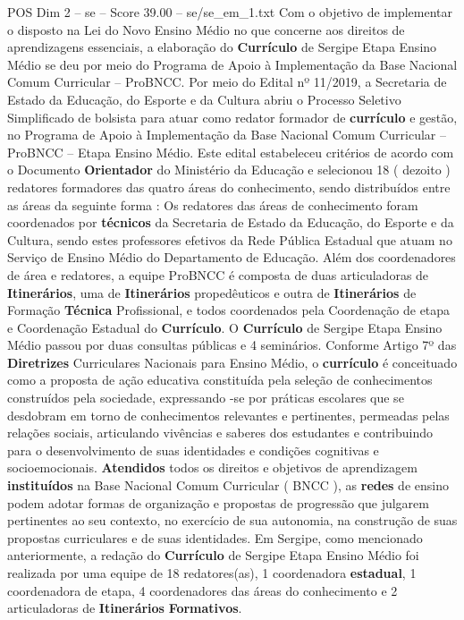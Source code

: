 \begin{textsample}{POS Dim 2 – se – Score 39.00 – se/se\_em\_1.txt}
Com o objetivo de implementar o disposto na Lei do Novo Ensino Médio no que concerne aos direitos de aprendizagens essenciais, a elaboração do \textbf{Currículo} de Sergipe Etapa Ensino Médio se deu por meio do Programa de Apoio à Implementação da Base Nacional Comum Curricular – ProBNCC.
Por meio do Edital nº 11/2019, a Secretaria de Estado da Educação, do Esporte e da Cultura abriu o Processo Seletivo Simplificado de bolsista para atuar como redator formador de \textbf{currículo} e gestão, no Programa de Apoio à Implementação da Base Nacional Comum Curricular – ProBNCC – Etapa Ensino Médio.
Este edital estabeleceu critérios de acordo com o Documento \textbf{Orientador} do Ministério da Educação e selecionou 18 ( dezoito ) redatores formadores das quatro áreas do conhecimento, sendo distribuídos entre as áreas da seguinte forma : Os redatores das áreas de conhecimento foram coordenados por \textbf{técnicos} da Secretaria de Estado da Educação, do Esporte e da Cultura, sendo estes professores efetivos da Rede Pública Estadual que atuam no Serviço de Ensino Médio do Departamento de Educação.
Além dos coordenadores de área e redatores, a equipe ProBNCC é composta de duas articuladoras de \textbf{Itinerários}, uma de \textbf{Itinerários} propedêuticos e outra de \textbf{Itinerários} de Formação \textbf{Técnica} Profissional, e todos coordenados pela Coordenação de etapa e Coordenação Estadual do \textbf{Currículo}.
O \textbf{Currículo} de Sergipe Etapa Ensino Médio passou por duas consultas públicas e 4 seminários.
Conforme Artigo 7º das \textbf{Diretrizes} Curriculares Nacionais para Ensino Médio, o \textbf{currículo} é conceituado como a proposta de ação educativa constituída pela seleção de conhecimentos construídos pela sociedade, expressando -se por práticas escolares que se desdobram em torno de conhecimentos relevantes e pertinentes, permeadas pelas relações sociais, articulando vivências e saberes dos estudantes e contribuindo para o desenvolvimento de suas identidades e condições cognitivas e socioemocionais. \textbf{Atendidos} todos os direitos e objetivos de aprendizagem \textbf{instituídos} na Base Nacional Comum Curricular ( BNCC ), as \textbf{redes} de ensino podem adotar formas de organização e propostas de progressão que julgarem pertinentes ao seu contexto, no exercício de sua autonomia, na construção de suas propostas curriculares e de suas identidades.
Em Sergipe, como mencionado anteriormente, a redação do \textbf{Currículo} de Sergipe Etapa Ensino Médio foi realizada por uma equipe de 18 redatores(as), 1 coordenadora \textbf{estadual}, 1 coordenadora de etapa, 4 coordenadores das áreas do conhecimento e 2 articuladoras de \textbf{Itinerários} \textbf{Formativos}.

\end{textsample}
